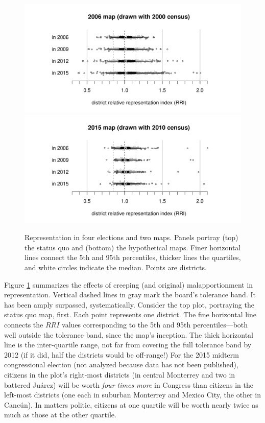 \documentclass[letter,12pt]{article}
\begin{document}
\begin{figure}
\begin{center}
    \includegraphics[width=.65\columnwidth]{rrin0615d0.pdf} \\
    \includegraphics[width=.65\columnwidth]{rrin0615d3.pdf} \\
\caption{Representation in four elections and two maps. Panels portray (top) the status quo and (bottom) the hypothetical maps. Finer horizontal lines connect the 5th and 95th percentiles, thicker lines the quartiles, and white circles indicate the median. Points are districts.}\label{F:malapp}
\end{center}
\end{figure}

Figure \ref{F:malapp} summarizes the effects of creeping (and original) malapportionment in representation. Vertical dashed lines in gray mark the board's tolerance band. It has been amply surpassed, systematically. Consider the top plot, portraying the status quo map, first. Each point represents one district. The fine horizontal line connects the $RRI$ values corresponding to the 5th and 95th percentiles---both well outside the tolerance band, since the map's inception. The thick horizontal line is the inter-quartile range, not far from covering the full tolerance band by 2012 (if it did, half the districts would be off-range!) For the 2015 midterm congressional election (not analyzed because data has not been published), citizens in the plot's right-most districts (in central Monterrey and two in battered Ju\'arez) will be worth \emph{four times more} in Congress than citizens in the left-most districts (one each in suburban Monterrey and Mexico City, the other in Canc\'un). In matters politic, citizens at one quartile will be worth nearly twice as much as those at the other quartile. 
\end{document}
